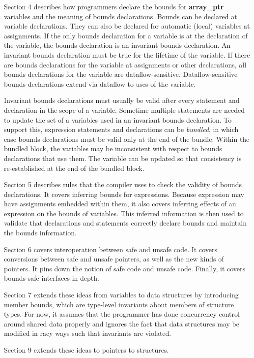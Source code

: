 \documentclass[]{article}
\begin{document}
Section 4 describes how programmers declare the bounds for
\textbf{array\_ptr} variables and the meaning of bounds declarations.
Bounds can be declared at variable declarations. They can also be
declared for automatic (local) variables at assignments. If the only
bounds declaration for a variable is at the declaration of the variable,
the bounds declaration is an invariant bounds declaration. An invariant
bounds declaration must be true for the lifetime of the variable. If
there are bounds declarations for the variable at assignments or other
declarations, all bounds declarations for the variable are
dataflow-sensitive. Dataflow-sensitive bounds declarations extend via
dataflow to uses of the variable.

Invariant bounds declarations must usually be valid after every
statement and declaration in the scope of a variable. Sometime multiple
statements are needed to update the set of a variables used in an
invariant bounds declaration. To support this, expression statements and
declarations can be \emph{bundled}, in which case bounds declarations
must be valid only at the end of the bundle. Within the bundled block,
the variables may be inconsistent with respect to bounds declarations
that use them. The variable can be updated so that consistency is
re-established at the end of the bundled block.

Section 5 describes rules that the compiler uses to check the validity
of bounds declarations. It covers inferring bounds for expressions.
Because expression may have assignments embedded within them, it also
covers inferring effects of an expression on the bounds of variables.
This inferred information is then used to validate that declarations and
statements correctly declare bounds and maintain the bounds information.

Section 6 covers interoperation between safe and unsafe code. It covers
conversions between safe and unsafe pointers, as well as the new kinds
of pointers. It pins down the notion of safe code and unsafe code.
Finally, it covers bounds-safe interfaces in depth.

Section 7 extends these ideas from variables to data structures by
introducing member bounds, which are type-level invariants about members
of structure types. For now, it assumes that the programmer has done
concurrency control around shared data properly and ignores the fact
that data structures may be modified in racy ways such that invariants
are violated.

Section 9 extends these ideas to pointers to structures.
\end{document}
